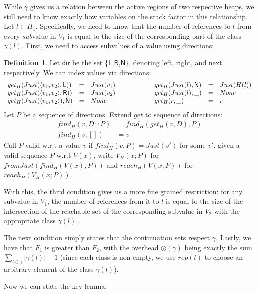 \documentclass{easychair}
\newcommand{\ms}[1]{\ensuremath{\mathsf{#1}}}
\newcommand{\oh}[1]{\oslash(#1)}
\theoremstyle{definition}
\newtheorem{definition}{Definition}
\begin{document}
While $\gamma$ gives us a relation between the active regions of two respective heaps, 
we still need to know 
exactly how variables on the stack factor in this relationship. Let $l \in H_1$. 
Specifically, we need to know that the number of references to $l$ from every \emph{sub}value
in $V_1$ is equal to the size of the corresponding part of the class $\gamma(l)$.  
First, we need to access 
subvalues of a value using directions: 

\begin{definition}
	Let \ms{dir} be the set \{\ms{L},\ms{R},\ms{N}\}, denoting left, right, and next 
	respectively. We can index values via directions:
        $$
	\begin{array}{lclclcl}
		get_H(Just(\pairexcst{v_1}{v_2},\ms{L})) &=& Just(v_1) & \hspace{4em} &
		get_H(Just(l),\ms{N}) &=& Just(H(l)) \\
                get_H(Just(\pairexcst{v_1}{v_2},\ms{R})) &=& Just(v_2) &&
                get_H(Just(l), \_) &=& None\\
                get_H(Just(\pairexcst{v_1}{v_2}),\ms{N}) &=& None &&
		get_H(r,\_) &=& r
	\end{array}
        $$
	Let $P$ be a sequence of directions. Extend $get$ to sequence of directions:
	\begin{align*}
		find_H(v,D::P) &= find_H(get_H(v,D),P)\\
		find_H(v,[]) &= v
	\end{align*}
	Call $P$ valid w.r.t a value $v$ if $find_H(v,P) = Just (v')$ for some $v'$.
        given a valid sequence $P$ w.r.t $V(x)$,
	write $V_H(x;P)$ for $fromJust(find_H(V(x),P))$
	and $reach_H(V(x;P))$ for $reach_H(V_H(x;P))$.
\end{definition}

With this, the third condition gives us a more fine grained restriction: for any subvalue in $V_1$,
the number of references from it to $l$ is equal to the size of 
the intersection of the reachable set of the corresponding subvalue in $V_2$
with the appropriate class $\gamma(l)$ .

The next condition simply states that the continuation sets respect $\gamma$. Lastly, 
we have that $F_1$ is greater than $F_2$, with the overhead $\oh{\gamma}$ being exactly the sum 
$\sum_{l \in \gamma} |\gamma(l)| - 1$ 
(since each class is non-empty, we use $rep(l)$ to choose an arbitrary element of the class $\gamma(l)$). 

Now we can state the key lemma:
\end{document}
